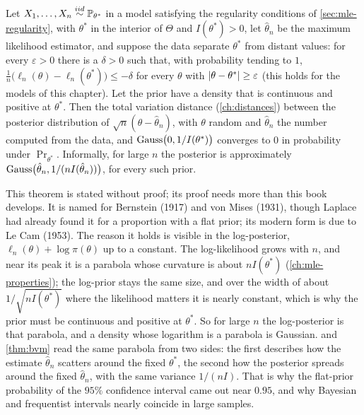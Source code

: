 
\begin{theorem}
\label{thm:bvm}
Let $X_1, \ldots, X_n \stackrel{iid}{\sim} \mathbb{P}_{\theta^*}$ in a model satisfying the regularity conditions of \cref{sec:mle-regularity}, with $\theta^*$ in the interior of $\Theta$ and $I(\theta^*) > 0$, let $\hat{\theta}_n$ be the maximum likelihood estimator, and suppose the data separate $\theta^*$ from distant values: for every $\varepsilon > 0$ there is a $\delta > 0$ such that, with probability tending to $1$, $\frac1n\big(\ell_n(\theta) - \ell_n(\theta^*)\big) \leq -\delta$ for every $\theta$ with $\lvert\theta - \theta^*\rvert \geq \varepsilon$ (this holds for the models of this chapter). Let the prior have a density that is continuous and positive at $\theta^*$. Then the total variation distance (\cref{ch:distances}) between the posterior distribution of $\sqrt{n}(\theta - \hat{\theta}_n)$, with $\theta$ random and $\hat{\theta}_n$ the number computed from the data, and $\text{Gauss}\big(0, 1/I(\theta^*)\big)$ converges to $0$ in probability under $\Pr_{\theta^*}$. Informally, for large $n$ the posterior is approximately $\text{Gauss}\big(\hat{\theta}_n, 1/(nI(\hat{\theta}_n))\big)$, for every such prior.
\end{theorem}

This theorem is stated without proof; its proof needs more than this book develops. It is named for Bernstein (1917) and von Mises (1931), though Laplace had already found it for a proportion with a flat prior; its modern form is due to Le Cam (1953).
The reason it holds is visible in the log-posterior, $\ell_n(\theta) + \log\pi(\theta)$ up to a constant.
The log-likelihood grows with $n$, and near its peak it is a parabola whose curvature is about $nI(\theta^*)$ (\cref{ch:mle-properties}); the log-prior stays the same size, and over the width of about $1/\sqrt{nI(\theta^*)}$ where the likelihood matters it is nearly constant, which is why the prior must be continuous and positive at $\theta^*$.
So for large $n$ the log-posterior is that parabola, and a density whose logarithm is a parabola is Gaussian.
 and \cref{thm:bvm} read the same parabola from two sides: the first describes how the estimate $\hat{\theta}_n$ scatters around the fixed $\theta^*$, the second how the posterior spreads around the fixed $\hat{\theta}_n$, with the same variance $1/(nI)$.
That is why the flat-prior probability of the $95\%$ confidence interval came out near $0.95$, and why Bayesian and frequentist intervals nearly coincide in large samples.

